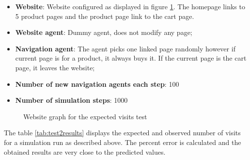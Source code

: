 \begin{itemize}
    \item \textbf{Website}: Website configured as displayed in figure 
    \ref{fig:test2website}. The homepage links to 5 product pages and the 
    product page link to the cart page.
    \item \textbf{Website agent}: Dummy agent, does not modify any page;
    \item \textbf{Navigation agent}: The agent picks one linked page randomly 
    however if current page is for a product, it always buys it. If the current 
    page is the cart page, it leaves the website;
    \item \textbf{Number of new navigation agents each step}: 100
    \item \textbf{Number of simulation steps}: 1000
\end{itemize}

\begin{figure}
\centering
{}
\caption{Website graph for the expected visits test} \label{fig:test2website}
\end{figure}

The table \ref{tab:test2results} displays the expected and observed number of 
visits for a simulation run as described above. The percent error is calculated 
and the obtained results are very close to the predicted values.

